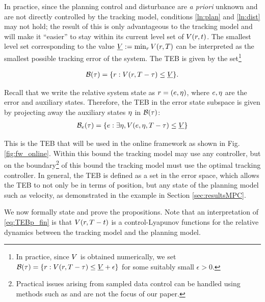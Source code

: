 In practice, since the planning control and disturbance are \textit{a priori} unknown and are not directly controlled by the tracking model, conditions \ref{ln:plan} and \ref{ln:dist} may not hold; the result of this is only advantageous to the tracking model and will make it ``easier'' to stay within its current level set of $V(r, t)$. 
The smallest level set corresponding to the value $\underline{V} := \min_{r} V(r,T)$ can be interpreted as the smallest possible tracking error of the system. 
The TEB is given by the set\footnote{In practice, since $V$ is obtained numerically, we set $\mathcal B(\tau) = \{r: V(r, T - \tau) \le \underline{V} + \epsilon\}$ for some suitably small $\epsilon>0$.}

\begin{align} \label{eq:TEB_fin}
\TEB(\tau) = \{\rstate: \valfunc(\rstate, \thor - \tau) \le \underline\valfunc\}.
\end{align}


Recall that we write the relative system state as $r = (e, \eta)$, where $e,\eta$ are the error and auxiliary states.
Therefore, the TEB in the error state subspace is given by projecting away the auxiliary states $\eta$ in $\mathcal B(\tau)$:
  \begin{align} \label{eq:TEBp_fin}
  \TEB_\estate(\tau) = \{\estate: \exists \astate, \valfunc(\estate, \astate, \thor-\tau) \le \underline\valfunc\}
  \end{align}
  
This is the TEB that will be used in the online framework as shown in Fig. \ref{fig:fw_online}. 
Within this bound the tracking model may use any controller, but on the boundary\footnote{Practical issues arising from sampled data control can be handled using methods such as \cite{Mitchell2012, Mitchell13, Dabadie2014} and are not the focus of our paper.} of this bound the tracking model must use the optimal tracking controller.
In general, the TEB is defined as a set in the error space, which allows the TEB to not only be in terms of position, but any state of the planning model such as velocity, as demonstrated in the example in Section \ref{sec:resultsMPC}.

We now formally state and prove the propositions. 
Note that an interpretation of \eqref{eq:TEBp_fin} is that $V(r, T - t)$ is a control-Lyapunov functions for the relative dynamics between the tracking model and the planning model.

